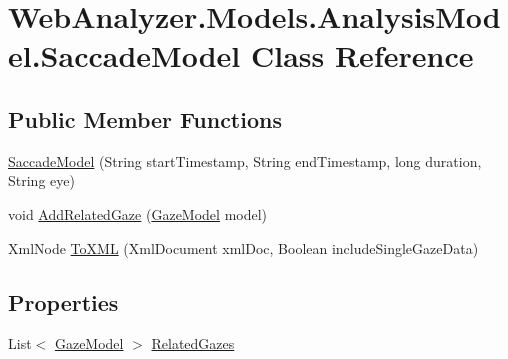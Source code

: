 \hypertarget{class_web_analyzer_1_1_models_1_1_analysis_model_1_1_saccade_model}{}\section{Web\+Analyzer.\+Models.\+Analysis\+Model.\+Saccade\+Model Class Reference}
\label{class_web_analyzer_1_1_models_1_1_analysis_model_1_1_saccade_model}
\subsection*{Public Member Functions}
\begin{DoxyCompactItemize}
\item 
\hyperlink{class_web_analyzer_1_1_models_1_1_analysis_model_1_1_saccade_model_a79d89d10a20d49d98c7d93151bc913c7}{Saccade\+Model} (String start\+Timestamp, String end\+Timestamp, long duration, String eye)
\item 
void \hyperlink{class_web_analyzer_1_1_models_1_1_analysis_model_1_1_saccade_model_a4167bccd0254507dd6664ed4a4691c82}{Add\+Related\+Gaze} (\hyperlink{class_web_analyzer_1_1_models_1_1_data_model_1_1_gaze_model}{Gaze\+Model} model)
\item 
Xml\+Node \hyperlink{class_web_analyzer_1_1_models_1_1_analysis_model_1_1_saccade_model_a631bef5fc5b9234cd8e81cc92bcbc276}{To\+X\+M\+L} (Xml\+Document xml\+Doc, Boolean include\+Single\+Gaze\+Data)
\end{DoxyCompactItemize}
\subsection*{Properties}
\begin{DoxyCompactItemize}
\item 
List$<$ \hyperlink{class_web_analyzer_1_1_models_1_1_data_model_1_1_gaze_model}{Gaze\+Model} $>$ \hyperlink{class_web_analyzer_1_1_models_1_1_analysis_model_1_1_saccade_model_a32d8fa96fd180fbbfee83b47fd8e72f9}{Related\+Gazes}
\end{DoxyCompactItemize}
